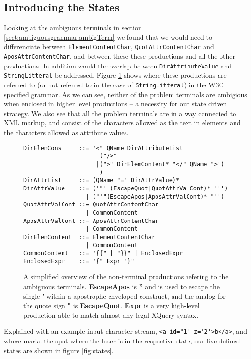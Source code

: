\subsection{Introducing the States}
\label{sect:rewriteGrammar:introduceStates}
Looking at the ambiguous terminals in section \ref{sect:ambiguousgrammar:ambigTerm} we found that we would need to differenciate between \verb!ElementContentChar!, \verb!QuotAttrContentChar! and \verb!AposAttrContentChar!, and between these these productions and all the other productions. In addition would the overlap between \verb!DirAttributeValue! and \verb!StringLitteral! be addressed. Figure \ref{fig:ambigTerminalRef} shows where these productions are referred to (or not referred to in the case of \verb!StringLitteral!) in the W3C specified grammar. As we can see, neither of the problem terminals are ambigious when enclosed in higher level productions -- a necessity for our state driven strategy. We also see that all the problem terminals are in a way connected to XML markup, and consist of the characters allowed as the text in elements and the characters allowed as attribute values.
\begin{figure}[h]
\begin{verbatim}
DirElemConst    ::= "<" QName DirAttributeList 
                      ("/>" 
                     |(">" DirElemContent* "</" QName ">")
                      )
DirAttrList     ::= (QName "=" DirAttrValue)*
DirAttrValue    ::= ('"' (EscapeQuot|QuotAttrValCont)* '"')
                  | ("'"(EscapeApos|AposAttrValCont)* "'")
QuotAttrValCont ::= QuotAttrContentChar
                  | CommonContent
AposAttrValCont ::= AposAttrContentChar
                  | CommonContent
DirElemContent  ::= ElementContentChar
                  | CommonContent
CommonContent   ::= "{{" | "}}" | EnclosedExpr
EnclosedExpr    ::= "{" Expr "}"
\end{verbatim}
\caption[Grammar reffering to amiguous terminals.]{A simplified overview of the non-terminal productions refering to the ambiguous terminals. \textbf{EscapeApos} is \textbf{''} and is used to escape the single \textbf{'} within a apostrophe enveloped construct, and the analog for the quote sign \textbf{"} is \textbf{EscapeQuot}. \textbf{Expr} is a very high-level production able to match almost any legal XQuery syntax.}
\label{fig:ambigTerminalRef}
\end{figure}
Explained with an example input character stream, \verb!<a id="1" z='2'>b</a>!, and where \framebox[1.0\width]{$\times$} marks the spot where the lexer is in the respective state, our five defined states are shown in figure \ref{fig:states}.
